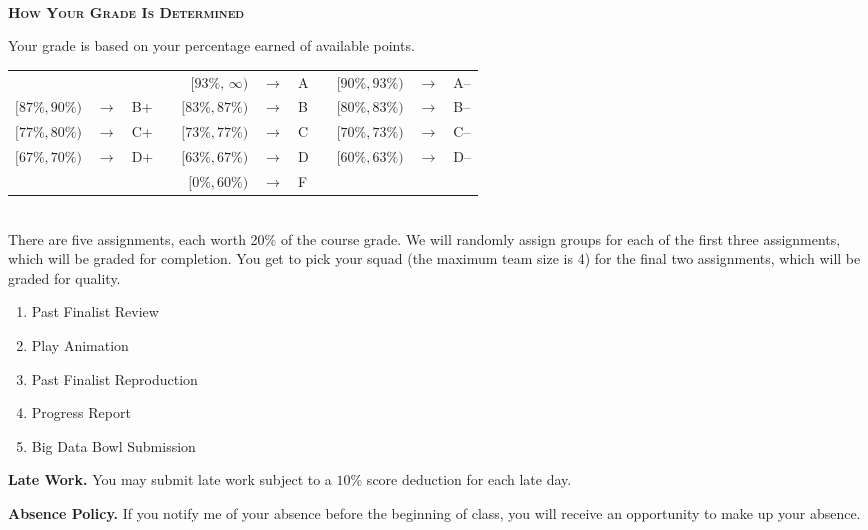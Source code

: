 \documentclass[11pt]{article}
\begin{document}
~\\
\textbf{\textsc{How Your Grade Is Determined}}
\begin{adjustwidth}{1cm}{0cm}
	Your grade is based on your percentage earned of available points.
  \begin{center}
    \begin{tabular}{rclcrclcrcl}
                      &               &     & & $[93\%,\,\infty)$ & $\rightarrow$ & A & & $[90\%, 93\%)$ & $\rightarrow$	& A--\\
      $[87\%, 90\%)$  & $\rightarrow$	& B+  & & $[83\%, 87\%)$  & $\rightarrow$ & B & & $[80\%, 83\%)$ & $\rightarrow$	& B--\\
      $[77\%, 80\%)$  & $\rightarrow$	& C+  & & $[73\%, 77\%)$  & $\rightarrow$ & C & & $[70\%, 73\%)$ & $\rightarrow$	& C--\\
      $[67\%, 70\%)$  & $\rightarrow$	& D+  & & $[63\%, 67\%)$  & $\rightarrow$ & D & & $[60\%, 63\%)$ & $\rightarrow$  & D--\\
                      &               &     & & $[ 0\%, 60\%)$  & $\rightarrow$ & F\\
    \end{tabular}
  \end{center}
  ~\\
  There are five assignments, each worth 20\% of the course grade. We will randomly assign groups for each of the first three assignments, which will be graded for completion. You get to pick your squad (the maximum team size is 4) for the final two assignments, which will be graded for quality.
  \begin{enumerate}
    \item Past Finalist Review
    \item Play Animation
    \item Past Finalist Reproduction
    \item Progress Report
    \item Big Data Bowl Submission
  \end{enumerate}

  \textbf{Late Work.} You may submit late work subject to a $10\%$ score deduction for each late day.

  \textbf{Absence Policy.} If you notify me of your absence before the beginning of class, you will receive an opportunity to make up your absence.
\end{adjustwidth}
\end{document}
